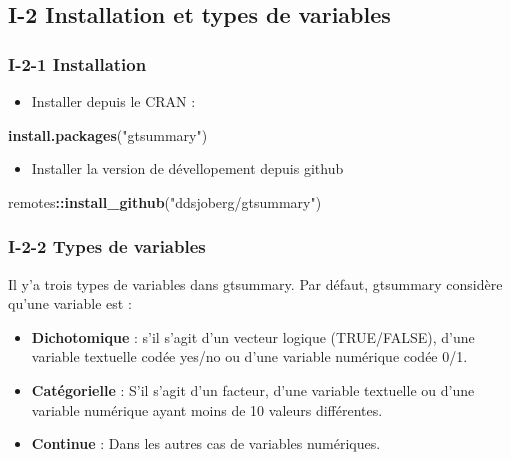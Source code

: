 \documentclass[
]{article}
\newenvironment{Shaded}{\begin{snugshade}}{\end{snugshade}}
\newcommand{\FunctionTok}[1]{\textcolor[rgb]{0.13,0.29,0.53}{\textbf{#1}}}
\newcommand{\NormalTok}[1]{#1}
\newcommand{\SpecialCharTok}[1]{\textcolor[rgb]{0.81,0.36,0.00}{\textbf{#1}}}
\newcommand{\StringTok}[1]{\textcolor[rgb]{0.31,0.60,0.02}{#1}}
\providecommand{\tightlist}{%
  \setlength{\itemsep}{0pt}\setlength{\parskip}{0pt}}
\begin{document}
\hypertarget{i-2-installation-et-types-de-variables}{%
\subsection{I-2 Installation et types de
variables}\label{i-2-installation-et-types-de-variables}}

\hypertarget{i-2-1-installation}{%
\subsubsection{I-2-1 Installation}\label{i-2-1-installation}}

\begin{itemize}
\tightlist
\item
  Installer depuis le CRAN :
\end{itemize}

\begin{Shaded}
\begin{Highlighting}[]
  \FunctionTok{install.packages}\NormalTok{(}\StringTok{"gtsummary"}\NormalTok{)}
\end{Highlighting}
\end{Shaded}

\begin{itemize}
\tightlist
\item
  Installer la version de dévellopement depuis github
\end{itemize}

\begin{Shaded}
\begin{Highlighting}[]
\NormalTok{remotes}\SpecialCharTok{::}\FunctionTok{install\_github}\NormalTok{(}\StringTok{"ddsjoberg/gtsummary"}\NormalTok{)}
\end{Highlighting}
\end{Shaded}

\hypertarget{i-2-2-types-de-variables}{%
\subsubsection{I-2-2 Types de
variables}\label{i-2-2-types-de-variables}}

Il y'a trois types de variables dans gtsummary. Par défaut, gtsummary
considère qu'une variable est :

\begin{itemize}
\item
  \textbf{Dichotomique} : s'il s'agit d'un vecteur logique (TRUE/FALSE),
  d'une variable textuelle codée yes/no ou d'une variable numérique
  codée 0/1.
\item
  \textbf{Catégorielle} : S'il s'agit d'un facteur, d'une variable
  textuelle ou d'une variable numérique ayant moins de 10 valeurs
  différentes.
\item
  \textbf{Continue} : Dans les autres cas de variables numériques.
\end{itemize}
\end{document}
